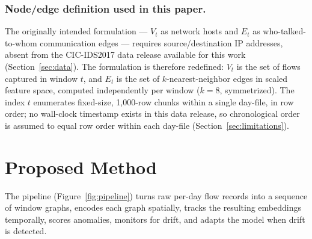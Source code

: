 \documentclass[twocolumn]{llncs}
\begin{document}
\subsubsection{Node/edge definition used in this paper.} The originally intended formulation --- $V_t$
as network hosts and $E_t$ as who-talked-to-whom communication edges --- requires source/destination
IP addresses, absent from the CIC-IDS2017 data release available for this work
(Section~\ref{sec:data}). The formulation is therefore redefined: $V_t$ is the set of flows captured
in window $t$, and $E_t$ is the set of $k$-nearest-neighbor edges in scaled feature space, computed
independently per window ($k=8$, symmetrized). The index $t$ enumerates fixed-size, 1{,}000-row
chunks within a single day-file, in row order; no wall-clock timestamp exists in this data release,
so chronological order is assumed to equal row order within each day-file
(Section~\ref{sec:limitations}).

\section{Proposed Method}
\label{sec:method}

The pipeline (Figure~\ref{fig:pipeline}) turns raw per-day flow records into a sequence of window
graphs, encodes each graph spatially, tracks the resulting embeddings temporally, scores anomalies,
monitors for drift, and adapts the model when drift is detected.
\end{document}
